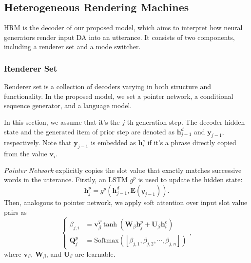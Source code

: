 \documentclass[letterpaper]{article} %
\begin{document}
\subsection{Heterogeneous Rendering Machines} 
\label{sec:Heterogeneous Rendering Machines}
	
	HRM is the decoder of our proposed model, which aims to interpret how neural generators render input DA into an utterance. It consists of two components, including a renderer set and a mode switcher.
	
\subsubsection{Renderer Set}
	
	Renderer set is a collection of decoders varying in both structure and functionality. In the proposed model, we set a pointer network, a conditional sequence generator, and a language model.
	
	In this section, we assume that it's the $j$-th generation step. The decoder hidden state and the generated item of prior step are denoted as $\mathbf{h}_{j-1}^d$ and $\mathbf{y}_{j-1}$, respectively. Note that $\mathbf{y}_{j-1}$ is embedded as $\mathbf{h}_i^s$ if it's a phrase directly copied from the value $\mathbf{v}_i$.

	\textit{Pointer Network} explicitly copies the slot value that exactly matches successive words in the utterance. Firstly, an LSTM $g^{p}$ is used to update the hidden state:
	\begin{equation}
	\mathbf{h}_j^p = g^p(\mathbf{h}_{j-1}^d, \mathbf{E}(y_{j-1})).
	\end{equation}
	Then, analogous to pointer network, we apply soft attention over input slot value pairs as
	\begin{equation}
	\left\{\begin{aligned}
	\beta_{j,i} & = \mathbf{v}^T_{\beta} \tanh(\mathbf{W}_{\beta} \mathbf{h}^p_{j} + \mathbf{U}_{\beta}\mathbf{h}^e_i) \\
	\mathbf{Q}^p_j & = \mathrm{Softmax}([\beta_{j, 1}, \beta_{j, 2}, \cdots, \beta_{j, n}])
	\end{aligned}\right.,
	\end{equation}
	where $\mathbf{v}_{\beta}$, $\mathbf{W}_{\beta}$, and $\mathbf{U}_{\beta}$ are learnable.  
	
\end{document}
